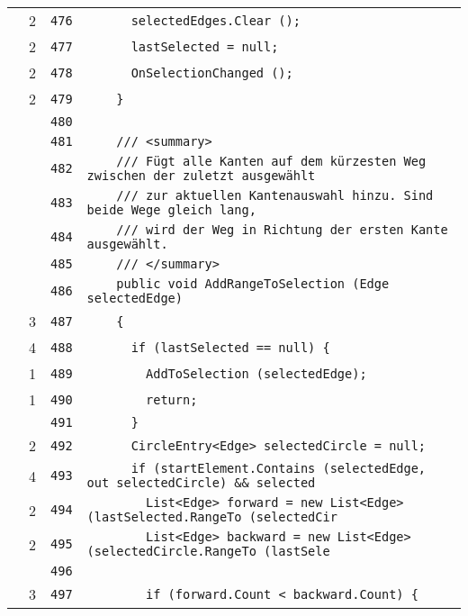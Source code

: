 \documentclass[a4paper,10pt]{article}
\begin{document}
\begin{longtable}[l]{lrrl}
\cellcolor{green} & 2 & \verb~476~ & \verb~      selectedEdges.Clear ();~\\
\cellcolor{green} & 2 & \verb~477~ & \verb~      lastSelected = null;~\\
\cellcolor{green} & 2 & \verb~478~ & \verb~      OnSelectionChanged ();~\\
\cellcolor{green} & 2 & \verb~479~ & \verb~    }~\\
\cellcolor{gray} &  & \verb~480~ & \verb~~\\
\cellcolor{gray} &  & \verb~481~ & \verb~    /// <summary>~\\
\cellcolor{gray} &  & \verb~482~ & \verb~    /// Fügt alle Kanten auf dem kürzesten Weg zwischen der zuletzt ausgewählt~\\
\cellcolor{gray} &  & \verb~483~ & \verb~    /// zur aktuellen Kantenauswahl hinzu. Sind beide Wege gleich lang,~\\
\cellcolor{gray} &  & \verb~484~ & \verb~    /// wird der Weg in Richtung der ersten Kante ausgewählt.~\\
\cellcolor{gray} &  & \verb~485~ & \verb~    /// </summary>~\\
\cellcolor{gray} &  & \verb~486~ & \verb~    public void AddRangeToSelection (Edge selectedEdge)~\\
\cellcolor{green} & 3 & \verb~487~ & \verb~    {~\\
\cellcolor{green} & 4 & \verb~488~ & \verb~      if (lastSelected == null) {~\\
\cellcolor{green} & 1 & \verb~489~ & \verb~        AddToSelection (selectedEdge);~\\
\cellcolor{green} & 1 & \verb~490~ & \verb~        return;~\\
\cellcolor{gray} &  & \verb~491~ & \verb~      }~\\
\cellcolor{green} & 2 & \verb~492~ & \verb~      CircleEntry<Edge> selectedCircle = null;~\\
\cellcolor{green} & 4 & \verb~493~ & \verb~      if (startElement.Contains (selectedEdge, out selectedCircle) && selected~\\
\cellcolor{green} & 2 & \verb~494~ & \verb~        List<Edge> forward = new List<Edge> (lastSelected.RangeTo (selectedCir~\\
\cellcolor{green} & 2 & \verb~495~ & \verb~        List<Edge> backward = new List<Edge> (selectedCircle.RangeTo (lastSele~\\
\cellcolor{gray} &  & \verb~496~ & \verb~~\\
\cellcolor{green} & 3 & \verb~497~ & \verb~        if (forward.Count < backward.Count) {~\\

\end{longtable}
\end{document}
